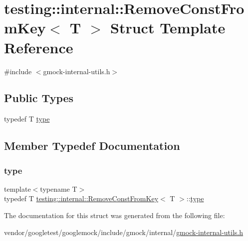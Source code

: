 \hypertarget{structtesting_1_1internal_1_1_remove_const_from_key}{}\section{testing\+:\+:internal\+:\+:Remove\+Const\+From\+Key$<$ T $>$ Struct Template Reference}
\label{structtesting_1_1internal_1_1_remove_const_from_key}


{\ttfamily \#include $<$gmock-\/internal-\/utils.\+h$>$}

\subsection*{Public Types}
\begin{DoxyCompactItemize}
\item 
typedef T \hyperlink{structtesting_1_1internal_1_1_remove_const_from_key_ab657b0a0fe4ebc499d27011f73c794c1}{type}
\end{DoxyCompactItemize}


\subsection{Member Typedef Documentation}
\mbox{\label{structtesting_1_1internal_1_1_remove_const_from_key_ab657b0a0fe4ebc499d27011f73c794c1}} 
\subsubsection{\texorpdfstring{type}{type}}
{\footnotesize\ttfamily template$<$typename T$>$ \\
typedef T \hyperlink{structtesting_1_1internal_1_1_remove_const_from_key}{testing\+::internal\+::\+Remove\+Const\+From\+Key}$<$ T $>$\+::\hyperlink{structtesting_1_1internal_1_1_remove_const_from_key_ab657b0a0fe4ebc499d27011f73c794c1}{type}}



The documentation for this struct was generated from the following file\+:\begin{DoxyCompactItemize}
\item 
vendor/googletest/googlemock/include/gmock/internal/\hyperlink{gmock-internal-utils_8h}{gmock-\/internal-\/utils.\+h}\end{DoxyCompactItemize}
